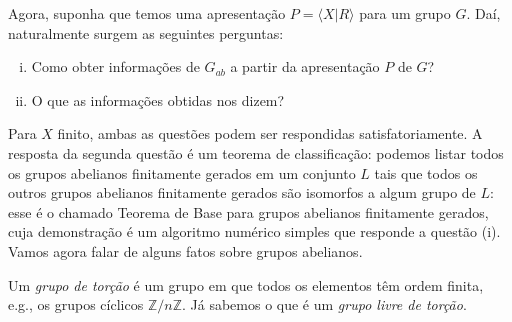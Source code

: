     	\par\vspace{0.3cm} Agora, suponha que temos uma apresentação $P = \langle X|R \rangle$ para um 
    	grupo $G$. Daí, naturalmente surgem as seguintes perguntas:
    	\begin{enumerate}[(i)]
    		\item Como obter informações de $G_{ab}$ a partir da apresentação $P$ de $G$?
    		\item O que as informações obtidas nos dizem? 
    	\end{enumerate}
    	\par\vspace{0.3cm} Para $X$ finito, ambas as questões podem ser respondidas satisfatoriamente. 
    	A resposta da segunda questão é um teorema de classificação: podemos listar todos os grupos abelianos
    	finitamente gerados em um conjunto $L$ tais que todos os outros grupos abelianos finitamente gerados 
    	são isomorfos a algum grupo de $L$: esse é o chamado Teorema de Base para grupos abelianos finitamente
    	gerados, cuja demonstração é um algoritmo numérico simples que responde a questão (i). Vamos agora 
    	falar de alguns fatos sobre grupos abelianos.
    	
    	\par\vspace{0.3cm} Um \textit{grupo de torção} é um grupo em que todos os elementos têm ordem finita,
    	e.g., os grupos cíclicos $\mathbb{Z}/n\mathbb{Z}$. Já sabemos o que é um \textit{grupo livre de torção}.
    	
